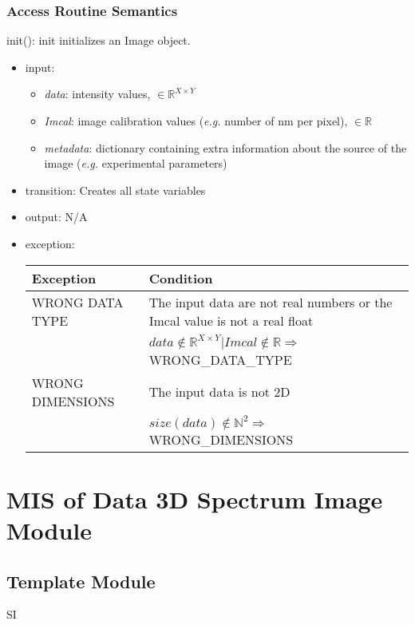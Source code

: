 \documentclass[12pt, titlepage]{article}
\begin{document}
\subsubsection{Access Routine Semantics}

\noindent init():
init initializes an Image object.
\begin{itemize}
    \item input:
    \begin{itemize}
        \item \textit{data}: intensity values, $\in \mathbb{R}^{X \times Y}$
        \item \textit{Imcal}: image calibration values (\textit{e.g.} number of
        \si{\nano\metre} per pixel), $\in \mathbb{R}$
        \item \textit{metadata}: dictionary containing extra information about
        the source of the image (\textit{e.g.} experimental parameters)
    \end{itemize}
    \item transition: Creates all state variables
    \item output: N/A
    \item exception:
    \begin{center}
        \begin{tabular}{p{4cm} p{11.5cm}}
            \toprule[0.15em]
            \textbf{Exception} & \textbf{Condition}\\
            \midrule[0.1em]
            WRONG DATA TYPE & The input data are not real numbers or the Imcal
            value is not a real float\\
            & $data \notin \mathbb{R}^{X \times Y}  | Imcal \notin \mathbb{R}
            \Rightarrow$ WRONG\_DATA\_TYPE \\ 
            \midrule[0.05em]
            WRONG DIMENSIONS & The input data is not 2D\\
            & $size(data) \notin \mathbb{N}^2 \Rightarrow $ WRONG\_DIMENSIONS\\
            \bottomrule[0.15em]
        \end{tabular}
    \end{center}
\end{itemize}

\section{MIS of Data 3D Spectrum Image Module} \label{Mod:SI}

\subsection{Template Module}
SI
\end{document}
